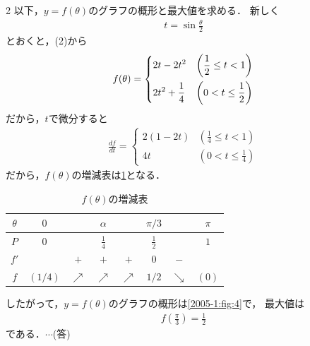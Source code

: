 \documentclass[../../../../main.tex]{subfiles}
\begin{document}
\begin{multicols}{2}
    \vspace{10pt}
    以下，$y=f(\theta)$のグラフの概形と最大値を求める．
    新しく
    \begin{align*}
        t = \sin\frac{\theta}{2}
    \end{align*}
    とおくと，(2)から
    \begin{align*}
        f(\theta) =
        \begin{dcases}
            2t - 2t^2          & \left(\frac{1}{2} \le t < 1\right) \\
            2t^2 + \frac{1}{4} & \left(0 < t \le \frac{1}{2}\right)
        \end{dcases}
    \end{align*}
    だから，$t$で微分すると
    \begin{align*}
        \frac{df}{dt} =
        \begin{cases}
            2(1-2t) & \left(\frac{1}{4} \le t < 1\right) \\
            4t      & \left(0 < t \le \frac{1}{4}\right)
        \end{cases}
    \end{align*}
    だから，$f(\theta)$の増減表は\cref{2005-1:table:1}となる．
    \begin{table}[H]
        \centering
        \caption{$f(\theta)$の増減表}
        \label{2005-1:table:1}
        \begin{tabular}{|c||c|c|c|c|c|c|c|}
            \hline
            $\theta$ & $0$     &            & $\alpha$      &            & $\pi/3$       &            & $\pi$ \\
            \hline
            $P$      & $0$     &            & $\frac{1}{4}$ &            & $\frac{1}{2}$ &            & $1$   \\
            \hline
            $f'$     &         & $+$        & $+$           & $+$        & $0$           & $-$        &       \\
            \hline
            $f$      & $(1/4)$ & $\nearrow$ & $\nearrow$    & $\nearrow$ & $1/2$         & $\searrow$ & $(0)$ \\
            \hline
        \end{tabular}
    \end{table}

    したがって，$y=f(\theta)$のグラフの概形は\cref{2005-1:fig:4}で，
    最大値は
    \begin{align*}
        f\left(\frac{\pi}{3}\right) = \frac{1}{2}
    \end{align*}
    である．$\cdots$(答)


\end{multicols}
\end{document}
